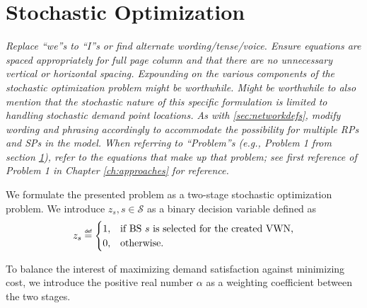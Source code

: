 \documentclass[12pt,dvipsnames]{report}
\newcommand\defeq{\mathrel{\overset{\makebox[0pt]{\mbox{\normalfont\tiny\sffamily def}}}{=}}}
\begin{document}
\section{Stochastic Optimization} \label{sec:stochopt}

\textit{Replace ``we''s to ``I''s or find alternate wording/tense/voice.  Ensure equations are spaced appropriately for full page column and that there are no unnecessary vertical or horizontal spacing.  Expounding on the various components of the stochastic optimization problem might be worthwhile.  Might be worthwhile to also mention that the stochastic nature of this specific formulation is limited to handling stochastic demand point locations.  As with \ref{sec:networkdefs}, modify wording and phrasing accordingly to accommodate the possibility for multiple RPs and SPs in the model.  When referring to ``Problem''s (e.g., Problem 1 from section \ref{sec:stochopt}), refer to the equations that make up that problem; see first reference of  Problem 1 in Chapter \ref{ch:approaches} for reference.}

We formulate the presented problem as a two-stage stochastic optimization problem.  We introduce $z_s, s \in \mathcal{S}$ as a binary decision variable defined as
\[ z_s \defeq
	\begin{cases}
		1,& \text{if BS $s$ is selected for the created VWN,}\\
		0,& \text{otherwise.}
	\end{cases}
\]

To balance the interest of maximizing demand satisfaction against minimizing cost, we introduce the positive real number $\alpha$ as a weighting coefficient between the two stages.
\end{document}
